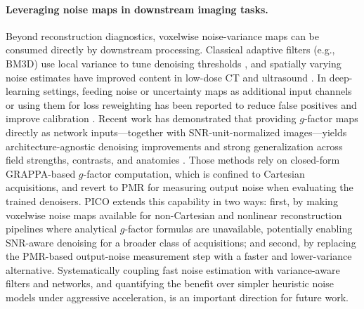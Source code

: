 \documentclass[AMA,STIX2COL,Linenumberson]{MRM}
\begin{document}
\paragraph{Leveraging noise maps in downstream imaging tasks.}
Beyond reconstruction diagnostics, voxelwise noise-variance 
maps can be consumed directly by downstream processing. 
Classical adaptive filters (e.g., BM3D) use local variance 
to tune denoising thresholds \cite{hanchate2020,lidenoising2014}, 
and spatially varying noise estimates have improved 
content in low-dose CT and ultrasound 
\cite{Hariharan_2020,yu2002}. In deep-learning settings, 
feeding noise or uncertainty maps as additional input channels 
or using them for loss reweighting has been reported to reduce 
false positives and improve calibration 
\cite{dou2025,wang2022,homolya2025raki}. Recent work has demonstrated that providing 
$g$-factor maps directly as network inputs---together with 
SNR-unit-normalized images---yields architecture-agnostic 
denoising improvements and strong generalization across field 
strengths, contrasts, and anatomies 
\cite{xue2025snraware,xue2025imtransformer}. Those methods 
rely on closed-form GRAPPA-based $g$-factor computation, 
which is confined to Cartesian acquisitions, and revert to PMR 
for measuring output noise when evaluating the trained 
denoisers. PICO extends this capability in two ways: first, by making voxelwise noise maps available for non-Cartesian and nonlinear reconstruction pipelines where analytical $g$-factor formulas are unavailable, potentially enabling SNR-aware denoising for a broader class of acquisitions; and second, by replacing the PMR-based output-noise measurement step with a faster and lower-variance alternative.
Systematically coupling fast noise estimation with 
variance-aware filters and networks, and quantifying the 
benefit over simpler heuristic noise models under aggressive 
acceleration, is an important direction for future work.

\end{document}
